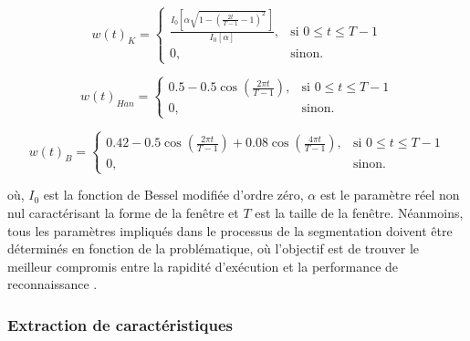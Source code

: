 \begin{equation}
	\label{eq:kaiser}
	w\left(t\right)_K = \left\{
	\begin{array}{ll}
		\frac{I_0\left[\alpha\sqrt{1-(\frac{2t}{T-1}-1)^2}\,\right]}{I_0\left[\alpha\right]}, & \mbox{si } 0 \leq t \leq T-1 \\
		0,                                    & \mbox{sinon.}
	\end{array}
	\right.
\end{equation}

\begin{equation}
	\label{eq:hann}
	w\left(t\right)_{Han} = \left\{
	\begin{array}{ll}
		0.5-0.5\cos(\frac{2\pi t}{T-1}), & \mbox{si } 0 \leq t \leq T-1 \\
		0, & \mbox{sinon.}
	\end{array}
	\right.
\end{equation}

\begin{equation}
	\label{eq:blackman}
	w\left(t\right)_B = \left\{
	\begin{array}{ll}
		0.42-0.5\cos(\frac{2\pi t}{T-1}) + 0.08\cos(\frac{4\pi t}{T-1}), & \mbox{si } 0 \leq t \leq T-1 \\
		0,                                    & \mbox{sinon.}
	\end{array}
	\right.
\end{equation}

\noindent où, $I_0 $ est la fonction de Bessel modifiée d'ordre zéro, $\alpha$ est le paramètre réel non nul caractérisant la forme de la fenêtre et $T$ est la taille de la fenêtre. Néanmoins, tous les paramètres impliqués dans le processus de la segmentation doivent être déterminés en fonction de la problématique, où l'objectif est de trouver le meilleur compromis entre la rapidité d'exécution et la performance de reconnaissance \citep{Banos2014}.

\subsubsection{Extraction de caractéristiques}

